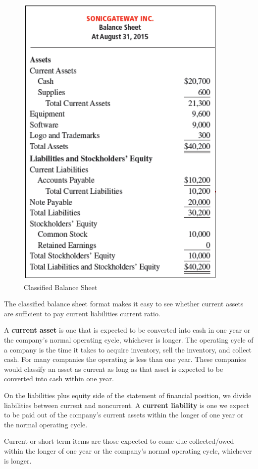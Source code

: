 \documentclass[../main.tex]{subfiles}
\begin{document}
	\begin{figure}[ht!]
		\centering
		\includegraphics[width=0.70\columnwidth]{images/c4/classified_balance_sheet.png}
		\caption{Classified Balance Sheet}
	\end{figure}

	The classified balance sheet format makes it easy to see whether current 
	assets are sufficient to pay current liabilities \eg current ratio. 
	
	A \textbf{current asset} is one that is 
	expected to be converted into cash in one year or the company’s normal 
	operating cycle, whichever is longer. The operating cycle of a company is 
	the time it takes to acquire inventory, sell the inventory, and collect 
	cash. For many companies the operating is less than one year. These 
	companies would classify an asset as current as long as that asset is 
	expected to be converted into cash within one year.
	
	On the liabilities plus equity side of the statement of financial position, 
	we divide liabilities between current and noncurrent. A \textbf{current 
	liability} 
	is one we expect to be paid out of the company’s current assets within the 
	longer of one year or the normal operating cycle.
	
	Current or short-term items are those expected to come due \ie 
	collected/owed within the longer of one year or the company's normal 
	operating cycle, whichever is longer.
	
\end{document}
